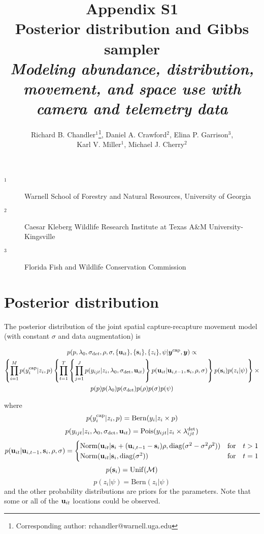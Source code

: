 \documentclass[12pt]{article}
\title{Appendix S1 \\ Posterior distribution and Gibbs sampler \\ \it Modeling abundance, distribution, movement, and space
  use with camera and telemetry data}
\author{Richard B. Chandler$^1$\footnote{Corresponding author: rchandler@warnell.uga.edu}, Daniel A. Crawford$^2$, Elina P. Garrison$^3$, \\
  Karl V. Miller$^1$, Michael J. Cherry$^2$}
\newcommand{\bs}{{\bf s}}
\newcommand{\bsi}{{\bf s}_i}
\newcommand{\bu}{{\bf u}}
\newcommand{\buit}{{\bf u}_{it}}
\newcommand{\buip}{{\bf u}_{i,t-1}}
\begin{document}
\maketitle

\vspace{12pt}

\begin{description}%
\item[$^1$] Warnell School of Forestry and Natural Resources, University of Georgia %
\item[$^2$] Caesar Kleberg Wildlife Research Institute at Texas A\&M University-Kingsville %
\item[$^3$] Florida Fish and Wildlife Conservation Commission %
\end{description}

\clearpage

\section*{Posterior distribution}

The posterior distribution of the joint spatial capture-recapture
movement model (with constant $\sigma$ and data augmentation) is  

\begin{multline}
  p(p, \lambda_0, \sigma_{\mathrm det}, \rho, \sigma, \{\bu_{it}\}, \{\bs_i\}, \{z_i\}, \psi | {\bm y}^{\rm cap},{\bm y}) \propto \\
  \left\{\prod_{i=1}^M p(y_i^{\rm cap}|z_i, p)
    \left\{\prod_{t=1}^T\left\{\prod_{j=1}^Jp(y_{ijt}|z_i,\lambda_0,\sigma_{\rm det},\buit)
    \right\}p(\buit|\bu_{i,t-1},\bsi,\rho,\sigma)\right\} %
  p(\bsi)p(z_i|\psi)\right\} \times \\
p(p)p(\lambda_0)p(\sigma_{\rm det})p(\rho)p(\sigma)p(\psi) \\
  \label{eq:post}
\end{multline}

where
\[
  p(y_i^{\rm cap}|z_i, p) = \mathrm{Bern}(y_i|z_i\times p)
\]
\[
  p(y_{ijt}|z_i,\lambda_0,\sigma_{\rm det},\buit) = \mathrm{Pois}(y_{ijt}|z_i \times \lambda^{\rm det}_{ijt})
\]
\[
  p(\buit|\bu_{i,t-1},\bsi,\rho,\sigma) =
  \begin{cases}
    \mathrm{Norm}(\buit|\bsi+(\buip-\bsi)\rho, \mathrm{diag}(\sigma^2
    - \sigma^2\rho^2)) & \mathrm{for}\quad t>1 \\
    \mathrm{Norm}(\buit|\bsi, \mathrm{diag}(\sigma^2)) & \mathrm{for}\quad t=1 \\
  \end {cases}
\]
\[
  p(\bsi) = \mathrm{Unif}(\mathcal M)
\]
\[
  p(z_i|\psi) = \mathrm{Bern}(z_i|\psi)
\]
and the other probability distributions are priors for the
parameters. Note that some or all of the $\buit$ locations could be
observed.  
\end{document}
